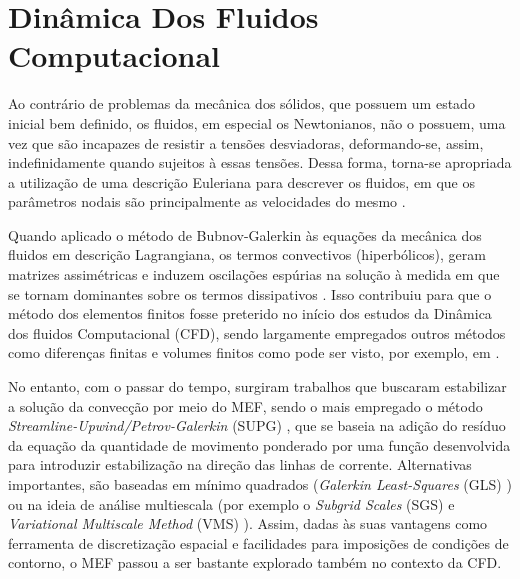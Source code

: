\section{Dinâmica Dos Fluidos Computacional} \label{CFD}

Ao contrário de problemas da mecânica dos sólidos, que possuem um estado inicial bem definido, os fluidos, em especial os Newtonianos, não o possuem, uma vez que são incapazes de resistir a tensões desviadoras, deformando-se, assim, indefinidamente quando sujeitos à essas tensões. Dessa forma, torna-se apropriada a utilização de uma descrição Euleriana para descrever os fluidos, em que os parâmetros nodais são principalmente as velocidades do mesmo \cite{fernandes2020tecnica}.

Quando aplicado o método de Bubnov-Galerkin às equações da mecânica dos fluidos em descrição Lagrangiana, os termos convectivos (hiperbólicos), geram matrizes assimétricas e induzem oscilações espúrias na solução à medida em que se tornam dominantes sobre os termos dissipativos \cite{bazilevs2013computational,brooks1982streamline}. Isso contribuiu para que o método dos elementos finitos fosse preterido no início dos estudos da Dinâmica dos fluidos Computacional (CFD), sendo largamente empregados outros métodos como diferenças finitas e volumes finitos como pode ser visto, por exemplo, em .

No entanto, com o passar do tempo, surgiram trabalhos que buscaram estabilizar a solução da convecção por meio do MEF, sendo o mais empregado o método \textit{Streamline-Upwind/Petrov-Galerkin} (SUPG) \cite{brooks1982streamline}, que se baseia na adição do resíduo da equação da quantidade de movimento ponderado por uma função desenvolvida para introduzir estabilização na direção das linhas de corrente. Alternativas importantes, são baseadas em mínimo quadrados (\textit{Galerkin Least-Squares} (GLS) \cite{hughes1989new,tezduyar1991stabilized}) ou na ideia de análise multiescala (por exemplo o \textit{Subgrid Scales} (SGS) \cite{piomelli1999large,hughes2000large} e \textit{Variational Multiscale Method} (VMS) \cite{hughes1995multiscale,hughes1998variational,hughes2000large}). Assim, dadas às suas vantagens como ferramenta de discretização espacial e facilidades para imposições de condições de contorno, o MEF passou a ser bastante explorado também no contexto da CFD.

